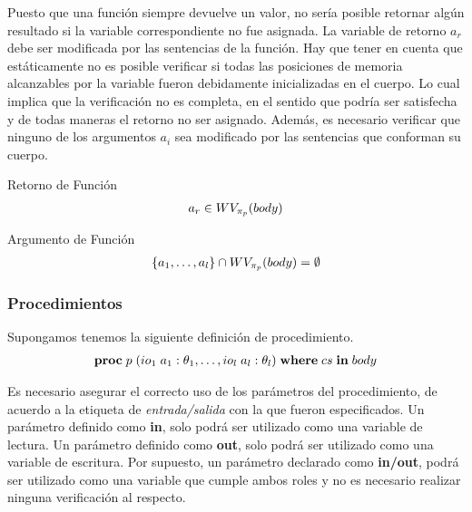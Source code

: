 Puesto que una función siempre devuelve un valor, no sería posible retornar algún resultado si la variable correspondiente no fue asignada.
La variable de retorno $a_r$ debe ser modificada por las sentencias de la función.
Hay que tener en cuenta que estáticamente no es posible verificar si todas las posiciones de memoria alcanzables por la variable fueron debidamente inicializadas en el cuerpo.
Lo cual implica que la verificación no es completa, en el sentido que podría ser satisfecha y de todas maneras el retorno no ser asignado.
Además, es necesario verificar que ninguno de los argumentos $a_i$ sea modificado por las sentencias que conforman su cuerpo.

\begin{Predicado}
\label{PFRetorno}
Retorno de Función
\begin{gather*}
a_r \in WV_{\pi_{p}}(body)
\end{gather*}
\end{Predicado}


\begin{Predicado}
\label{PFArgumento}
Argumento de Función
\begin{gather*}
\{ a_1, \ldots, a_l \} \cap WV_{\pi_{p}}(body) = \emptyset
\end{gather*}
\end{Predicado}

\subsubsection{Procedimientos}

Supongamos tenemos la siguiente definición de procedimiento.
\begin{gather*}
\mathbf{proc} \; p \; (io_1 \; a_1: \theta_1, \ldots, io_l \; a_l: \theta_l) \; \mathbf{where} \; cs \; \mathbf{in} \; body
\end{gather*}

Es necesario asegurar el correcto uso de los parámetros del procedimiento, de acuerdo a la etiqueta de \textit{entrada/salida} con la que fueron especificados.
Un parámetro definido como \textbf{in}, solo podrá ser utilizado como una variable de lectura.
Un parámetro definido como \textbf{out}, solo podrá ser utilizado como una variable de escritura.
Por supuesto, un parámetro declarado como \textbf{in/out}, podrá ser utilizado como una variable que cumple ambos roles y no es necesario realizar ninguna verificación al respecto.

